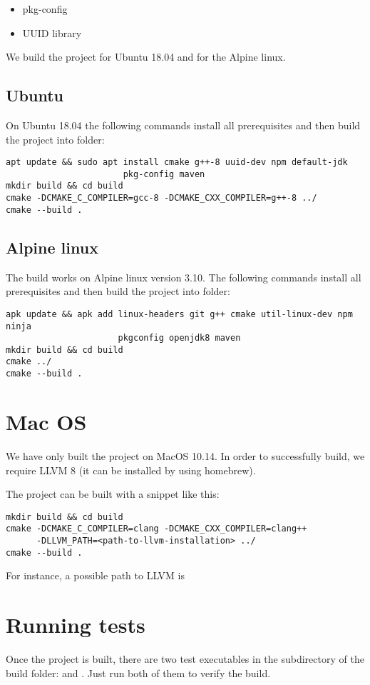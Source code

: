 \begin{itemize}
	\item pkg-config
	\item UUID library
\end{itemize}


We build the project for Ubuntu 18.04 and for the Alpine linux.
\subsection{Ubuntu}
On Ubuntu 18.04 the following commands install all prerequisites and then build the project into  folder:

\begin{verbatim}
apt update && sudo apt install cmake g++-8 uuid-dev npm default-jdk
                       pkg-config maven
mkdir build && cd build
cmake -DCMAKE_C_COMPILER=gcc-8 -DCMAKE_CXX_COMPILER=g++-8 ../
cmake --build .
\end{verbatim}


\subsection{Alpine linux}

The build works on Alpine linux version 3.10. The following commands install all prerequisites and then build the project into  folder:
\begin{verbatim}
apk update && apk add linux-headers git g++ cmake util-linux-dev npm ninja
                      pkgconfig openjdk8 maven
mkdir build && cd build
cmake ../
cmake --build .
\end{verbatim}


\section{Mac OS}
We have only built the project on MacOS 10.14. In order to successfully build, we require LLVM 8 (it can be installed by using homebrew).

The project can be built with a snippet like this:
\begin{verbatim}
mkdir build && cd build
cmake -DCMAKE_C_COMPILER=clang -DCMAKE_CXX_COMPILER=clang++
      -DLLVM_PATH=<path-to-llvm-installation> ../
cmake --build .
\end{verbatim}
For instance, a possible path to LLVM is 

\section{Running tests}
Once the project is built, there are two test executables in the  subdirectory of the build folder:  and . Just run both of them to verify the build.
